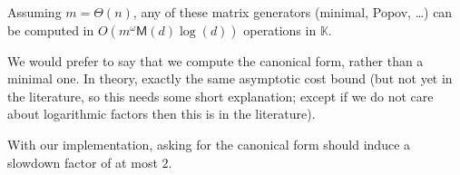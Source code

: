 \documentclass[12pt]{article}
\newcommand{\field}{\mathbb{K}} %
\newcommand{\rdim}{m} %
\newcommand{\cdim}{n} %
\begin{document}
\begin{corollary}
  Assuming $\rdim = \Theta(\cdim)$, any of these matrix generators (minimal,
  Popov, \ldots) can be computed in $O(\rdim^\omega \mathsf{M}(d) \log(d))$
  operations in $\field$.
\end{corollary}

We would prefer to say that we compute the canonical form, rather than a
minimal one. In theory, exactly the same asymptotic cost bound (but not yet in
the literature, so this needs some short explanation; except if we do not care
about logarithmic factors then this is in the literature).

With our implementation, asking for the canonical form should induce a slowdown
factor of at most $2$.



\end{document}
